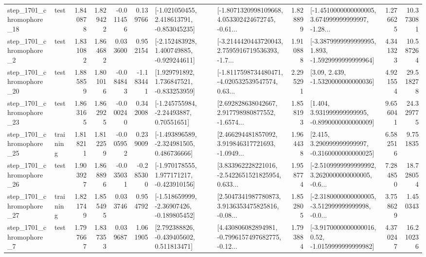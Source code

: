 \begin{tabular}{llrrrrllrlrr}
 step\_1701\_chromophore\_18 &      test &      1.840878 &    1.829422 &     -0.011456 &  0.139766 &   [-1.021050455, 2.418613791, -0.853045235] &  [-1.8071320998109668, 4.053302424672745, -0.61... &       1.828899 &  [-1.4510000000000005, 3.674999999999997, -1.28... &            1.276625 &         10.373081 \\
  step\_1701\_chromophore\_2 &      test &      1.831082 &    1.864682 &      0.033600 &  0.952154 &   [-2.152483928, 1.400749885, -0.929244611] &  [-3.2144420443720043, 2.7595916719536393, -1.7... &       1.910888 &  [-3.3879999999999995, 1.893, -1.5929999999999964] &            4.341323 &         10.587264 \\
 step\_1701\_chromophore\_20 &      test &      1.885859 &    1.801016 &     -0.084843 & -1.183441 &    [1.929791892, 1.736847521, -0.833253959] &  [-1.8117598734480471, -4.020532539547574, 0.63... &       2.295291 &                 [3.09, 2.439, -1.5320000000000036] &            4.921554 &         29.518278 \\
 step\_1701\_chromophore\_23 &      test &      1.863165 &    1.862925 &     -0.000240 &  0.342008 &     [-1.245755984, -2.24493887, 0.70551651] &  [2.692828638042667, 2.917798980877552, -1.6574... &       1.858193 &    [1.404, 3.931999999999995, -0.8990000000000009] &            9.656041 &         24.329775 \\
 step\_1701\_chromophore\_25 &  training &      1.818211 &    1.812259 &     -0.005952 &  0.239009 &   [-1.493896589, -2.324981505, 0.486736666] &  [2.466294481857092, 3.919846317721693, -1.0949... &       1.964438 &    [2.415, 3.290999999999997, -0.3160000000000025] &            6.582516 &          9.751835 \\
 step\_1701\_chromophore\_26 &      test &      1.903927 &    1.868896 &     -0.035031 & -0.285300 &   [-1.970178555, 1.977171217, -0.423910156] &  [3.833962228221016, -2.5422651521825954, 0.633... &       1.958774 &  [-2.5109999999999992, 3.2620000000000005, -0.6... &            7.284850 &         18.728054 \\
 step\_1701\_chromophore\_27 &  training &      1.821749 &    1.855495 &      0.033746 &  0.954792 &   [-1.518659999, -2.36907426, -0.189805452] &  [2.5047341987780873, 3.9136353475825816, -0.08... &       1.852805 &  [-2.3180000000000005, -3.512999999999998, -0.0... &            3.758629 &          1.450343 \\
  step\_1701\_chromophore\_7 &      test &      1.797667 &    1.837353 &      0.039687 &  1.061905 &    [2.792388826, -0.439405602, 0.511813471] &  [4.430806082894981, -0.7996157497682775, -0.12... &       1.793884 &   [-3.9170000000000016, 0.52, -1.0159999999999982] &            4.370247 &         16.210236 \\

\end{tabular}

